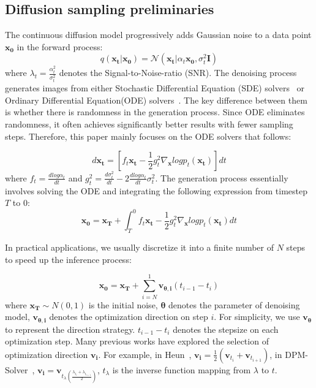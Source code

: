\documentclass[10pt,twocolumn,letterpaper]{article}
\begin{document}
    \subsection{Diffusion sampling preliminaries}

    The continuous diffusion model progressively adds Gaussian noise to a data point $\bm{x_0}$ in the forward process:
    \begin{equation}
        \label{eq:forward}
        q(\bm{x_t}|\bm{x_0}) = \mathcal N(\bm{x_t} |\alpha_t \bm{x_0}, \sigma_t^2 \bm{I})
    \end{equation}
    where $\lambda_t = \frac{\alpha_t^2}{\sigma_t^2}$ denotes the Signal-to-Noise-ratio (SNR). The denoising process generates images from either Stochastic Differential Equation (SDE) solvers~\cite{ho2020denoising, nichol2021improved} or Ordinary Differential Equation(ODE) solvers~\cite{rf,ddim}.
    The key difference between them is whether there is randomness in the generation process. 
    Since ODE eliminates randomness, it often achieves significantly better results with fewer sampling steps.
    Therefore, this paper mainly focuses on the ODE solvers that follows:
    
    \begin{equation}
        \label{eq:ode}d\bm{x_t}=[f_t\bm{x_t}-\frac{1}{2}g^{2}_{t}\nabla_{\bm{x}}logp_{t}(\bm{x_t})]dt
    \end{equation}
    where $f_t=\frac{dlog\alpha_t}{dt}$ and $g_t^2=\frac{d\sigma_t^2}{dt} - 2\frac{dlog\alpha_t}{dt}\sigma_t^2$. The generation process essentially involves solving the ODE and integrating the following expression from timestep $T$ to $0$:
    \begin{equation}
        \label{eq:integral}
        \bm{x_{0}}= \bm{x_{T}}+ \int_{T}^{0} f_t\bm{x_t}-\frac{1}{2}g^{2}_{t}\nabla_{\bm{x}}logp_{t}(\bm{x_t}) dt
    \end{equation}



    In practical applications, we usually discretize it into a finite number of $N$ steps to speed up the inference process:

    \begin{equation}
        \label{eq:discretize}
        \bm{x_{0}}= \bm{x_{T}}+ \sum_{i=N}^{1}\bm{v_{\theta,i}} (t_{i-1} - t_{i})
    \end{equation}
    where $\bm{x_T} \sim N(0,1)$ is the initial noise, $\bm{\theta}$ denotes the parameter of denoising model, $\bm{v_{\theta,i}}$ denotes the optimization direction on step  $i$. For simplicity, we use $\bm{v_{\theta}}$ to represent the direction strategy. $t_{i-1} - t_{i}$ denotes the stepsize on each optimization step. Many previous works have explored the selection of optimization direction $\bm{v_{i}}$. For example, in Heun~\cite{heun,edm}, $\bm{v_i} = \frac{1}{2}(\bm{v}_{t_i} + \bm{v}_{t_{i+1}})$, 
    in DPM-Solver~\cite{dpm}, $\bm{v_i} = \bm{v}_{t_\lambda(\frac{\lambda_{t_{i}} + \lambda_{t_{i+1}}}{2})}$, $t_\lambda$ is the inverse function mapping from $\lambda$ to $t$.
\end{document}
